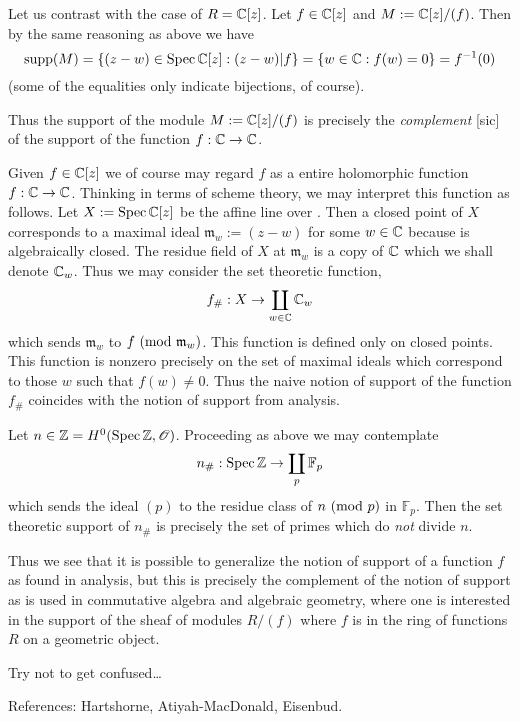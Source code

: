 \documentclass[10pt,a4paper,reqno]{amsart}
\begin{document}
\begin{ap}
Let us contrast with the case of $R = \mathbb{C}[z]$. Let $f\in \mathbb{C}[z]$ and $M :=
\mathbb{C}[z]/(f)$. Then by the same reasoning as above we have \[\text{supp}(M) =
\{(z-w) \in \mathrm{Spec}\, \mathbb{C}[z] : (z-w) | f\} = \{w \in \mathbb{C} : f(w) = 0\} =
f^{-1}(0)\] (some of the equalities only indicate bijections, of course).

Thus the support of the module $M := \mathbb{C}[z]/(f)$ is precisely the
\emph{complement} [sic] of the support of the function $f : \mathbb{C} \rightarrow \mathbb{C}$.
\end{ap}

\begin{ap}
Given $f\in \mathbb{C}[z]$ we of course may regard $f$ as a entire holomorphic function
$f: \mathbb{C}\rightarrow \mathbb{C}$. Thinking in terms of scheme theory, we may interpret
this function as follows. Let $X := \mathrm{Spec}\, \mathbb{C}[z]$ be the affine line over \C{}.
Then a closed point of $X$ corresponds to a maximal ideal $\mathfrak{m}_w :=
(z-w)$ for some $w\in \mathbb{C}$ because \C{} is algebraically closed. The residue
field of $X$ at $\mathfrak{m}_w$ is a copy of $\mathbb{C}$ which we shall denote
$\mathbb{C}_w$. Thus we may consider the set theoretic function, \[ f_\# : X
\rightarrow \coprod_{w\in \mathbb{C}} \mathbb{C}_w \] which sends $\mathfrak{m}_w$ to $f
\text{ } (\mathrm{mod}\text{ } \mathfrak{m}_w)$. This function is defined only on closed points. This
function is nonzero precisely on the set of maximal ideals which correspond to
those $w$ such that $f(w) \neq 0$. Thus the naive notion of support of the
function $f_\#$ coincides with the notion of support from analysis.
\end{ap}

\begin{ap}
Let $n \in \mathbb{Z} = H^0(\mathrm{Spec}\, \mathbb{Z}, \mathscr{O}) $. Proceeding as above we may
contemplate \[ n_\# : \mathrm{Spec}\, \mathbb{Z} \rightarrow \coprod_{p} \mathbb{F}_p \] which
sends the ideal $(p)$ to the residue class of $n\text{ } (\mathrm{mod}\text{ } p)$ in $\mathbb{F}_p$.
Then the set theoretic support of $n_\#$ is precisely the set of primes which
do \emph{not} divide $n$.
\end{ap}

\begin{ap}
Thus we see that it is possible to generalize the notion of support of a
function $f$ as found in analysis, but this is precisely the complement of the
notion of support as is used in commutative algebra and algebraic geometry,
where one is interested in the support of the sheaf of modules $R/(f)$ where
$f$ is in the ring of functions $R$ on a geometric object.

Try not to get confused\ldots
\end{ap}

\bigskip

\noindent References: Hartshorne, Atiyah-MacDonald, Eisenbud.
\end{document}
